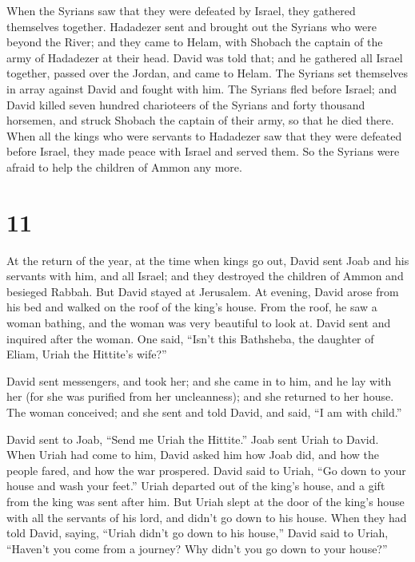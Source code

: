  When the Syrians saw that they were defeated by Israel,
they gathered themselves together.  Hadadezer sent and
brought out the Syrians who were beyond the River; and they came to
Helam, with Shobach the captain of the army of Hadadezer at their head.
 David was told that; and he gathered all Israel together,
passed over the Jordan, and came to Helam. The Syrians set themselves in
array against David and fought with him.  The Syrians fled
before Israel; and David killed seven hundred charioteers of the Syrians
and forty thousand horsemen, and struck Shobach the captain of their
army, so that he died there.  When all the kings who were
servants to Hadadezer saw that they were defeated before Israel, they
made peace with Israel and served them. So the Syrians were afraid to
help the children of Ammon any more.

\hypertarget{section-10}{%
\section{11}\label{section-10}}

 At the return of the year, at the time when kings go out,
David sent Joab and his servants with him, and all Israel; and they
destroyed the children of Ammon and besieged Rabbah. But David stayed at
Jerusalem.  At evening, David arose from his bed and walked
on the roof of the king's house. From the roof, he saw a woman bathing,
and the woman was very beautiful to look at.  David sent and
inquired after the woman. One said, ``Isn't this Bathsheba, the daughter
of Eliam, Uriah the Hittite's wife?''

 David sent messengers, and took her; and she came in to
him, and he lay with her (for she was purified from her uncleanness);
and she returned to her house.  The woman conceived; and she
sent and told David, and said, ``I am with child.''

 David sent to Joab, ``Send me Uriah the Hittite.'' Joab
sent Uriah to David.  When Uriah had come to him, David
asked him how Joab did, and how the people fared, and how the war
prospered.  David said to Uriah, ``Go down to your house and
wash your feet.'' Uriah departed out of the king's house, and a gift
from the king was sent after him.  But Uriah slept at the
door of the king's house with all the servants of his lord, and didn't
go down to his house.  When they had told David, saying,
``Uriah didn't go down to his house,'' David said to Uriah, ``Haven't
you come from a journey? Why didn't you go down to your house?''

